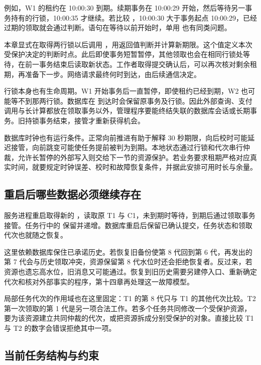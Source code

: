 例如，W1 的租约在 10:00:30 到期。续期事务在 10:00:29 开始，然后等待另一事务持有的行锁，10:00:35 才继续。若比较 ，10:00:30 大于事务起点 10:00:29，已经过期的领取就会通过判断。语句在等待以前开始时，单用  也有同类问题。


本章显式在取得两行锁以后调用 ，用返回值判断并计算新期限。这个值定义本次受保护决定的判断时点。此后即使事务短暂暂停，其他领取也会在相同行锁处等待，在前一事务结束后读取新状态。工作者取得提交确认后，可以再次核对剩余租期，再准备下一步。网络请求最终何时到达，由后续通信决定。

行锁本身也有生命周期。W1 开始事务后一直暂停，即使租约已经到期，W2 也可能等不到那两行锁。数据库在  到达时会保留原事务及行锁。因此外部查询、支付调用与长计算都放在领取事务以外，管理程序要能终结失联的数据库会话或长期事务。旧持锁事务结束，接管才重新获得机会。

数据库时钟也有运行条件。正常向前推进有助于解释 30 秒期限，向后校时可能延迟接管，向前跳变可能使任务提前被判为到期。本地状态通过行锁和代次串行仲裁，允许长暂停的外部写入则交给下一节的资源保护。若业务要求租期严格对应真实时间，就要规定时钟误差、校时和故障恢复条件，并据此安排可用时长与余量。

\subsection*{重启后哪些数据必须继续存在}

服务进程重启取得新的 ，读取原 T1 与 C1，未到期时等待，到期后通过领取事务接管。任务行中的  保留并递增。数据库重启后保留已确认提交，任务状态和领取代次也就随之恢复。

这里依赖数据库保住已承诺历史。若恢复旧备份使第 8 代回到第 6 代，再发出的第 7 代会与历史领取冲突，资源保留第 8 代水位时还会拒绝恢复者。反过来，若资源也遗忘高水位，旧消息又可能通过。恢复到旧历史需要另建停入口、重新确定代次和核对外部事实的程序，第十四章再处理这一故障模型。

局部任务代次的作用域也在这里固定：T1 的第 8 代只与 T1 的其他代次比较。T2 第一次领取的第 1 代是另一项合法工作。若多个任务共同修改一个受保护资源，要为该资源建立共同仲裁的代次，或把资源拆成分别受保护的对象。直接比较 T1 与 T2 的数字会错误拒绝其中一项。

\subsection*{当前任务结构与约束}

